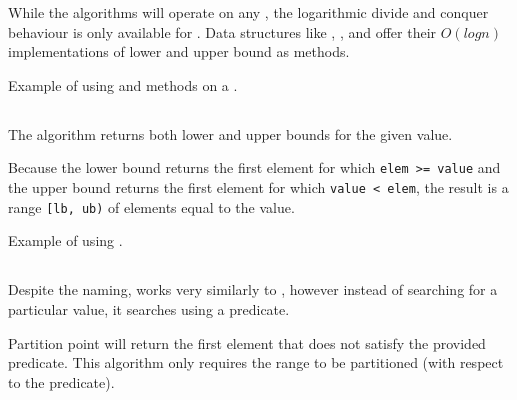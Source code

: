 While the algorithms will operate on any , the logarithmic divide and conquer behaviour is only available for . Data structures like , ,  and  offer their $O(logn)$ implementations of lower and upper bound as methods.

\begin{box-note}
\footnotesize Example of using  and  methods on a .
\tcblower
{}
\end{box-note}

\subsection{\texorpdfstring{}{\texttt{std::equal\_range}}}

The  algorithm returns both lower and upper bounds for the given value.


Because the lower bound returns the first element for which \texttt{elem >= value} and the upper bound returns the first element for which \texttt{value < elem}, the result is a range \texttt{[lb, ub)} of elements equal to the value.

\begin{box-note}
\footnotesize Example of using .
\tcblower
{}
\end{box-note}

\subsection{\texorpdfstring{}{\texttt{std::partition\_point}}}

Despite the naming,  works very similarly to , however instead of searching for a particular value, it searches using a predicate.


Partition point will return the first element that does not satisfy the provided predicate. This algorithm only requires the range to be partitioned (with respect to the predicate).

